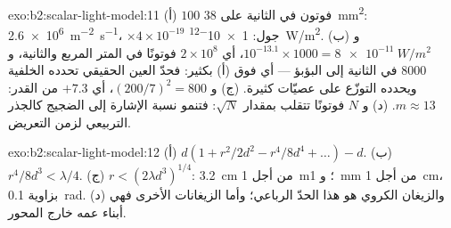 \begin{solution}{exo:b2:scalar-light-model:11}
(أ) $100$ فوتون في الثانية على \qty{38}{mm^2}: \qty{2.6e6}{m^{-2}.s^{-1}}، $\times4 \times
10^{-19}$ جول: \qty{1e-12}{W/m^2}. (ب) و $10^{-13.1} \times 1000 = \qty{8e-11}{W/m^2}$، أي $2 \times 10^8$
فوتونًا في المتر المربع والثانية، و $8000$ في الثانية إلى البؤبؤ
--- أي فوق (أ) بكثير: فحدّ العين الحقيقي تحدده الخلفية ويحدده
التوزّع على عصيّات كثيرة. (ج) و $(200/7)^2 = 800$، أي $+7.3$ من القدر: $m \approx
13$. (د) و $N$ فوتونًا تتقلب بمقدار $\sqrt N$: فتنمو نسبة الإشارة إلى الضجيج
كالجذر التربيعي لزمن التعريض.
\end{solution}

\begin{solution}{exo:b2:scalar-light-model:12}
(أ) $d(1 + r^2/2d^2 - r^4/8d^4 + \dots) - d$. (ب) $r^4/8d^3 < \lambda/4$. (ج) $r <
(2\lambda d^3)^{1/4}$: \qty{3.2}{cm} من أجل \qty{1}{m}؛ و \qty{1}{mm} من أجل \qty{1}{cm}، بزاوية
\qty{0.1}{rad}. (د) والزيغان الكروي هو هذا الحدّ الرباعي؛ وأما
الزيغانات الأخرى فهي أبناء عمه خارج المحور.
\end{solution}


